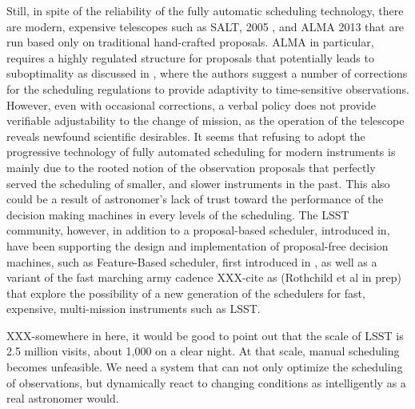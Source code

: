 \documentclass[12pt]{aastex62}
\theoremstyle{definition}
\begin{document}
Still, in spite of the reliability of the fully automatic scheduling technology, there are modern, expensive telescopes such as SALT, 2005 \citep{brink2008salt}, and ALMA 2013 \citep{wootten2003atacama} that are run based only on traditional hand-crafted proposals. ALMA in particular, requires a highly regulated structure for proposals that potentially leads to suboptimality as discussed in \citep{alexander2017enabling}, where the authors suggest a number of corrections for the scheduling regulations to provide adaptivity to time-sensitive observations. However, even with occasional corrections, a verbal policy does not provide verifiable adjustability to the change of mission, as the operation of the telescope reveals newfound scientific desirables. It seems that refusing to adopt the progressive technology of fully automated scheduling for modern instruments is mainly due to the rooted notion of the observation proposals that perfectly served the scheduling of smaller, and slower instruments in the past. This also could be a result of astronomer's lack of trust toward the performance of the decision making machines in every levels of the scheduling. The LSST community, however, in addition to a proposal-based scheduler, introduced in\citep{delgado2016lsst}, have been supporting the design and implementation of proposal-free decision machines, such as Feature-Based scheduler, first introduced in \citep{naghib2016feature}, as well as a variant of the fast marching army cadence XXX-cite as (Rothchild et al in prep) that explore the possibility of a new generation of the schedulers for fast, expensive, multi-mission instruments such as LSST.

XXX-somewhere in here, it would be good to point out that the scale of LSST is 2.5 million visits, about 1,000 on a clear night. At that scale, manual scheduling becomes unfeasible. We need a system that can not only optimize the scheduling of observations, but dynamically react to changing conditions as intelligently as a real astronomer would. 
\end{document}
